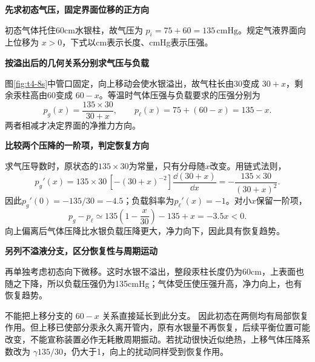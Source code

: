 \begin{solution}\textbf{先求初态气压，固定界面位移的正方向}\par\nobreak
初态气体托住60cm水银柱，故气压为 $p_i=75+60=135\,\mathrm{cmHg}$。规定气液界面向上位移为 $x>0$，下式以cm表示长度、cmHg表示压强。


\par\medskip{}\noindent\textbf{按溢出后的几何关系分别求气压与负载}\par\nobreak
图\ref{fig:t4-8s}中管口固定，向上移动会使水银溢出，故气柱长由30变成 $30+x$，剩余汞柱高由60变成 $60-x$。等温时气体压强与负载要求的压强分别为
\[p_g(x)=\frac{135\times30}{30+x},\qquad p_\ell(x)=75+(60-x)=135-x.\]
两者相减才决定界面的净推力方向。



\par\medskip{}\noindent\textbf{比较两个压降的一阶项，判定恢复方向}\par\nobreak
求气压导数时，原状态的$135\times30$为常量，只有分母随$x$改变。用链式法则，
\[
p_g'(x)=135\times30\,[-(30+x)^{-2}]\frac{\dd(30+x)}{\dd x}
=-\frac{135\times30}{(30+x)^2}.
\]
因此$p_g'(0)=-135/30=-4.5$；负载斜率为$p_\ell'(x)=-1$。对小$x$保留一阶项，
\[p_g-p_\ell\simeq135\left(1-\frac x{30}\right)-135+x
=-3.5x<0.\]
向上偏离后气体压降比水银负载压降更大，净力向下，因此具有恢复趋势。


\par\medskip{}\noindent\textbf{另列不溢液分支，区分恢复性与周期运动}\par\nobreak
再单独考虑初态向下微移。这时水银不溢出，整段汞柱长度仍为60cm，上表面也随之下降，所以负载压强仍为135cmHg；气体受压使压强升高，净力向上，也有恢复趋势。

不能把上移分支的 $60-x$ 关系直接延长到此分支。
因此初态在两侧均有局部恢复作用。但上移已使部分汞永久离开管内，原有水银量不再恢复，后续平衡位置可能改变，不能宣称装置必作无耗散周期振动。若扰动很快近似绝热，上移气体压降系数改为 $\gamma135/30$，仍大于1，向上的扰动同样受到恢复作用。

\end{solution}
